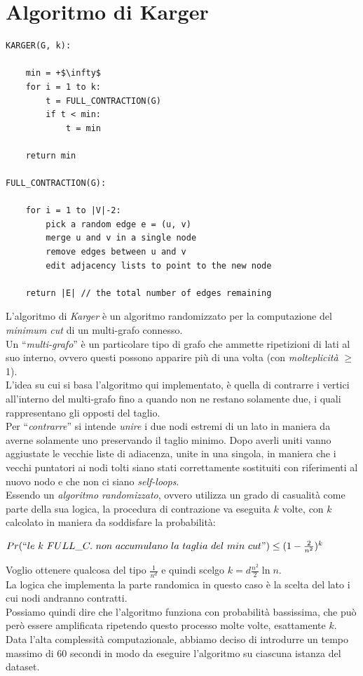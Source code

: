 \section{Algoritmo di Karger}\label{karger}
\begin{lstlisting}[mathescape=true]
KARGER(G, k):

	min = +$\infty$
	for i = 1 to k:		
		t = FULL_CONTRACTION(G)		
		if t < min:
			t = min
			
	return min

FULL_CONTRACTION(G):

	for i = 1 to |V|-2:
		pick a random edge e = (u, v)
		merge u and v in a single node
		remove edges between u and v
		edit adjacency lists to point to the new node
		
	return |E| // the total number of edges remaining
\end{lstlisting}	

L'algoritmo di \textit{Karger} è un algoritmo randomizzato per la computazione del \textit{minimum cut} di un multi-grafo connesso.\\
Un ``\textit{multi-grafo}'' è un particolare tipo di grafo che ammette ripetizioni di lati al suo interno, ovvero questi possono apparire più di una volta (con \textit{molteplicità} $\geq$ 1).\\
L'idea su cui si basa l'algoritmo qui implementato, è quella di contrarre i vertici all'interno del multi-grafo fino a quando non ne restano solamente due, i quali rappresentano gli opposti del taglio.\\
Per ``\textit{contrarre}'' si intende \textit{unire} i due nodi estremi di un lato in maniera da averne solamente uno preservando il taglio minimo. 
Dopo averli uniti vanno aggiustate le vecchie liste di adiacenza, unite in una singola, in maniera che i vecchi puntatori ai nodi tolti siano stati correttamente sostituiti con riferimenti al nuovo nodo e che non ci siano \textit{self-loops}.\\
Essendo un \textit{algoritmo randomizzato}, ovvero utilizza un grado di casualità come parte della sua logica, la procedura di contrazione va eseguita $k$ volte, con $k$ calcolato in maniera da soddisfare la probabilità:
\begin{center}
	$Pr(``le~k~FULL\_C.~non~accumulano~la~taglia~del~min~cut") \leq (1-\frac{2}{n^2})^k$
\end{center}
Voglio ottenere qualcosa del tipo $\frac{1}{n^d}$ e quindi scelgo $k = d\frac{n^2}{2}\ln n$.\\
La logica che implementa la parte randomica in questo caso è la scelta del lato i cui nodi andranno contratti.\\
Possiamo quindi dire che l'algoritmo funziona con probabilità bassissima, che può però essere amplificata ripetendo questo processo molte volte, esattamente $k$.\\
Data l'alta complessità computazionale, abbiamo deciso di introdurre un tempo massimo di 60 secondi in modo da eseguire l'algoritmo su ciascuna istanza del dataset.

